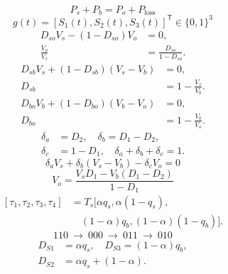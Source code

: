\begin{equation}P_s+P_b=P_o+P_{\mathrm{loss}}\end{equation}
\begin{equation}g(t)=[S_1(t),S_2(t),S_3(t)]^{\mathsf T}\in\{0,1\}^{3}\end{equation}
\begin{equation}\begin{aligned}D_{so}V_s-(1-D_{so})V_o&=0,\\ \frac{V_o}{V_s}&=\frac{D_{so}}{1-D_{so}}.\end{aligned}\end{equation}
\begin{equation}\begin{aligned}D_{sb}V_s+(1-D_{sb})(V_s-V_b)&=0,\\ D_{sb}&=1-\frac{V_s}{V_b}.\end{aligned}\end{equation}
\begin{equation}\begin{aligned}D_{bo}V_b+(1-D_{bo})(V_b-V_o)&=0,\\ D_{bo}&=1-\frac{V_b}{V_o}.\end{aligned}\end{equation}
\begin{equation}\begin{aligned}\delta_a&=D_2,\quad \delta_b=D_1-D_2,\\ \delta_c&=1-D_1,\quad\delta_a+\delta_b+\delta_c=1.\end{aligned}\end{equation}
\begin{equation}\delta_a V_s+\delta_b(V_s-V_b)-\delta_cV_o=0\end{equation}
\begin{equation}V_o=\frac{V_sD_1-V_b(D_1-D_2)}{1-D_1}\end{equation}
\begin{equation}\begin{aligned}[\tau_1,\tau_2,\tau_3,\tau_4]&=T_s[\alpha q_s,\alpha(1-q_s),\\ &\quad(1-\alpha)q_b,(1-\alpha)(1-q_b)].\end{aligned}\end{equation}
\begin{equation}110\ \longrightarrow\ 000\ \longrightarrow\ 011\ \longrightarrow\ 010\end{equation}
\begin{equation}\begin{aligned}D_{S1}&=\alpha q_s,\quad D_{S3}=(1-\alpha)q_b,\\ D_{S2}&=\alpha q_s+(1-\alpha).\end{aligned}\end{equation}
